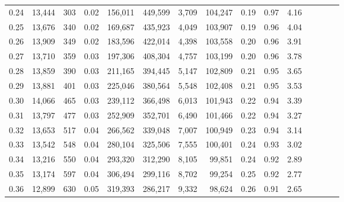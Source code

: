 \begin{tabular}{rrrcrrrrrrrrrrr}
0.24 &  13,444 &    303 &                                       0.02 &  156,011 &  449,599 &    3,709 &  104,247 &  0.19 &  0.97 &                         4.16 \\
0.25 &  13,676 &    340 &                                       0.02 &  169,687 &  435,923 &    4,049 &  103,907 &  0.19 &  0.96 &                         4.04 \\
0.26 &  13,909 &    349 &                                       0.02 &  183,596 &  422,014 &    4,398 &  103,558 &  0.20 &  0.96 &                         3.91 \\
0.27 &  13,710 &    359 &                                       0.03 &  197,306 &  408,304 &    4,757 &  103,199 &  0.20 &  0.96 &                         3.78 \\
0.28 &  13,859 &    390 &                                       0.03 &  211,165 &  394,445 &    5,147 &  102,809 &  0.21 &  0.95 &                         3.65 \\
0.29 &  13,881 &    401 &                                       0.03 &  225,046 &  380,564 &    5,548 &  102,408 &  0.21 &  0.95 &                         3.53 \\
0.30 &  14,066 &    465 &                                       0.03 &  239,112 &  366,498 &    6,013 &  101,943 &  0.22 &  0.94 &                         3.39 \\
0.31 &  13,797 &    477 &                                       0.03 &  252,909 &  352,701 &    6,490 &  101,466 &  0.22 &  0.94 &                         3.27 \\
0.32 &  13,653 &    517 &                                       0.04 &  266,562 &  339,048 &    7,007 &  100,949 &  0.23 &  0.94 &                         3.14 \\
0.33 &  13,542 &    548 &                                       0.04 &  280,104 &  325,506 &    7,555 &  100,401 &  0.24 &  0.93 &                         3.02 \\
0.34 &  13,216 &    550 &                                       0.04 &  293,320 &  312,290 &    8,105 &   99,851 &  0.24 &  0.92 &                         2.89 \\
0.35 &  13,174 &    597 &                                       0.04 &  306,494 &  299,116 &    8,702 &   99,254 &  0.25 &  0.92 &                         2.77 \\
0.36 &  12,899 &    630 &                                       0.05 &  319,393 &  286,217 &    9,332 &   98,624 &  0.26 &  0.91 &                         2.65 \\

\end{tabular}
